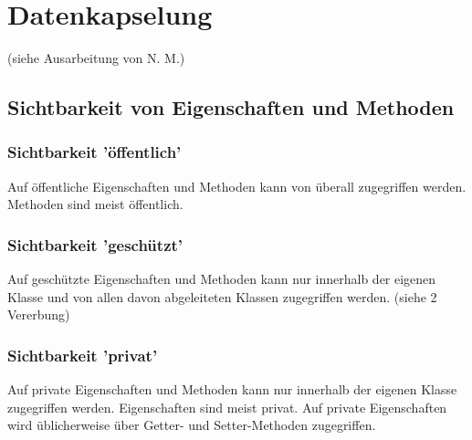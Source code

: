 \section{Datenkapselung}
	
	(siehe Ausarbeitung von N. M.)
	
	\subsection{Sichtbarkeit von Eigenschaften und Methoden}
	
	
	\subsubsection{Sichtbarkeit 'öffentlich'}
		Auf öffentliche Eigenschaften und Methoden kann von überall zugegriffen werden. Methoden sind meist öffentlich.
		
	\subsubsection{Sichtbarkeit 'geschützt'}
		Auf geschützte Eigenschaften und Methoden kann nur innerhalb der eigenen Klasse und von allen davon abgeleiteten Klassen
		zugegriffen werden. (siehe 2 Vererbung)
		
	\subsubsection{Sichtbarkeit 'privat'}
		Auf private Eigenschaften und Methoden kann nur innerhalb der eigenen Klasse zugegriffen werden. Eigenschaften sind
		meist privat. Auf private Eigenschaften wird üblicherweise über Getter- und Setter-Methoden zugegriffen.
